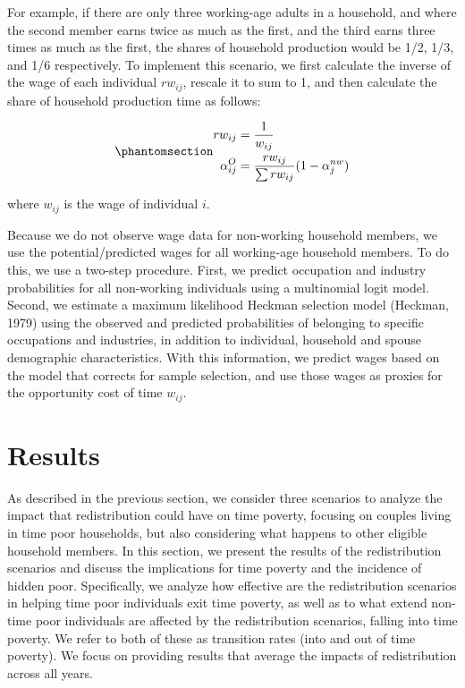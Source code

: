 \documentclass[
  11pt,
]{article}
\begin{document}
For example, if there are only three working-age adults in a household,
and where the second member earns twice as much as the first, and the
third earns three times as much as the first, the shares of household
production would be 1/2, 1/3, and 1/6 respectively. To implement this
scenario, we first calculate the inverse of the wage of each individual
\(rw_{ij}\), rescale it to sum to 1, and then calculate the share of
household production time as follows:

\begin{equation}\phantomsection\label{eq-r3}{\begin{aligned}
rw_{ij} &= \frac{1}{w_{ij}} \\
\alpha_{ij}^O &= \frac{rw_{ij}}{\sum rw_{ij}} (1-\alpha_{j}^{nw})
\end{aligned}
}\end{equation}

where \(w_{ij}\) is the wage of individual \(i\).

Because we do not observe wage data for non-working household members,
we use the potential/predicted wages for all working-age household
members. To do this, we use a two-step procedure. First, we predict
occupation and industry probabilities for all non-working individuals
using a multinomial logit model. Second, we estimate a maximum
likelihood Heckman selection model (Heckman, 1979) using the observed
and predicted probabilities of belonging to specific occupations and
industries, in addition to individual, household and spouse demographic
characteristics. With this information, we predict wages based on the
model that corrects for sample selection, and use those wages as proxies
for the opportunity cost of time \(w_{ij}\).

\section{Results}\label{results}

As described in the previous section, we consider three scenarios to
analyze the impact that redistribution could have on time poverty,
focusing on couples living in time poor households, but also considering
what happens to other eligible household members. In this section, we
present the results of the redistribution scenarios and discuss the
implications for time poverty and the incidence of hidden poor.
Specifically, we analyze how effective are the redistribution scenarios
in helping time poor individuals exit time poverty, as well as to what
extend non-time poor individuals are affected by the redistribution
scenarios, falling into time poverty. We refer to both of these as
transition rates (into and out of time poverty). We focus on providing
results that average the impacts of redistribution across all years.
\end{document}
